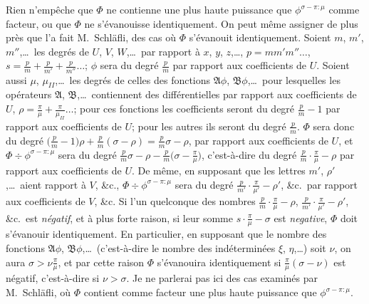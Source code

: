 \documentclass[11pt,a4paper]{book}
\begin{document}
Rien n'emp\^eche que $\Phi$ ne contienne une plus haute puissance que
$\phi^{\sigma - \pi:\mu}$ comme facteur, ou que $\Phi$ ne s'\'evanouisse
identiquement. On peut m\^eme assigner de plus pr\`es que l'a fait
M.~Schl\"afli, des cas o\`u $\Phi$ s'\'evanouit identiquement. Soient
$m$, $m'$, $m''$,\ldots\ les degr\'es de $U$, $V$, $W$,\ldots\ par rapport
\`a $x$, $y$, $z$,\ldots, $p = mm'm''\ldots$, $s = \tfrac{p}{m} + \tfrac{p}{m'} + \tfrac{p}{m''}\ldots$;
$\phi$ sera du degr\'e $\tfrac{p}{m}$ par rapport aux coefficients de $U$.
Soient aussi $\mu$, $\mu_{\scriptscriptstyle II}$,\ldots\ les degr\'es de celles
des fonctions $\mathfrak{A}\phi$, $\mathfrak{B}\phi$,\ldots\ pour lesquelles
les op\'erateurs $\mathfrak{A}$, $\mathfrak{B}$,\ldots\ contiennent des
diff\'erentielles par rapport aux coefficients de $U$,
$\rho = \tfrac{\pi}{\mu} + \tfrac{\pi}{\mu_{\scriptscriptstyle II}}\ldots$;
pour ces fonctions les coefficients seront du degr\'e $\tfrac{p}{m}-1$ par
rapport aux coefficients de $U$; pour les autres ils seront du degr\'e
$\tfrac{p}{m}$. $\Phi$ sera donc du degr\'e
$\bigl(\tfrac{p}{m}-1\bigr)\rho + \tfrac{p}{m}(\sigma - \rho)
= \tfrac{p}{m}\sigma - \rho$, par rapport aux coefficients de $U$, et
$\Phi \div \phi^{\sigma - \pi:\mu}$ sera du degr\'e
$\tfrac{p}{m}\sigma - \rho - \tfrac{p}{m}\bigl(\sigma - \tfrac{\pi}{\mu}\bigr)$,
c'est-\`a-dire du degr\'e
$\tfrac{p}{m} \cdot \tfrac{\pi}{\mu} - \rho$ par rapport aux coefficients de $U$.
De m\^eme, en supposant que les lettres $m'$, $\rho'$,\ldots\ aient rapport
\`a $V$, \&c., $\Phi \div \phi^{\sigma - \pi:\mu}$ sera du degr\'e
$\tfrac{p}{m'} \cdot \tfrac{\pi}{\mu'} - \rho'$, \&c.\ par rapport aux
coefficients de $V$, \&c. Si l'un quelconque des nombres
$\tfrac{p}{m} \cdot \tfrac{\pi}{\mu} - \rho$,
$\tfrac{p}{m'} \cdot \tfrac{\pi}{\mu'} - \rho'$, \&c.\ est
\textit{n\'egatif}, et \`a plus forte raison, si leur somme
$s \cdot \tfrac{\pi}{\mu} - \sigma$ est \textit{negative}, $\Phi$ doit
s'\'evanouir identiquement. En particulier, en supposant que le nombre des
fonctions $\mathfrak{A}\phi$, $\mathfrak{B}\phi$,\ldots\ (c'est-\`a-dire le nombre
des ind\'etermin\'ees $\xi$, $\eta$,\ldots) soit $\nu$, on aura
$\sigma > \nu\tfrac{\pi}{\mu}$, et par cette raison $\Phi$ s'\'evanouira
identiquement si $\tfrac{\pi}{\mu}(\sigma - \nu)$ est n\'egatif, c'est-\`a-dire
si $\nu > \sigma$. Je ne parlerai pas ici des cas examin\'es par
M.~Schl\"afli, o\`u $\Phi$ contient comme facteur une plus haute puissance
que $\phi^{\sigma - \pi:\mu}$.

\newpage
\end{document}
